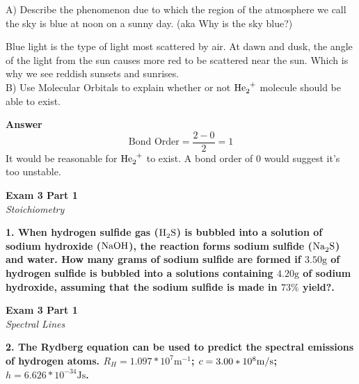 \documentclass{article}
\begin{document}
    A) Describe the phenomenon due to which the region of the atmosphere we call the sky is blue at noon on a sunny day. (aka Why is the sky blue?)

    Blue light is the type of light most scattered by air. At dawn and dusk, the angle of the light from the sun causes more red to be scattered near the sun. Which is why we see reddish sunsets and sunrises.\\[1cm]

    B) Use Molecular Orbitals to explain whether or not $\ce{He2+}$ molecule should be able to exist.

    \textbf{Answer}\\
    $$\text{Bond Order} = \dfrac{2 - 0}{2} = 1$$
    It would be reasonable for $\ce{He2+}$ to exist. A bond order of 0 would suggest it's too unstable.

    \pagebreak


    \begin{center}
        \textbf{Exam 3 Part 1}\\
        \textit{Stoichiometry}
    \end{center}
    \textbf{1. When hydrogen sulfide gas ($\ce{H2S}$) is bubbled into a solution of sodium hydroxide ($\ce{NaOH}$), the reaction forms sodium sulfide ($\ce{Na2S}$) and water. How many grams of sodium sulfide are formed if $3.50 \si{\gram}$ of hydrogen sulfide is bubbled into a solutions containing $4.20 \si{\gram}$ of sodium hydroxide, assuming that the sodium sulfide is made in $73\%$ yield?.}

    \pagebreak

    \begin{center}
        \textbf{Exam 3 Part 1}\\
        \textit{Spectral Lines}
    \end{center}
    \textbf{2. The Rydberg equation can be used to predict the spectral emissions of hydrogen atoms. $R_{H} = 1.097 * 10^{7}  \si{\meter^{-1}}$; $c = 3.00 * 10^{8} \si[per-mode=symbol]{\meter\per\second}$; $h = 6.626 * 10^{-34} \si{\joule} \si{\second}$.}
\end{document}
